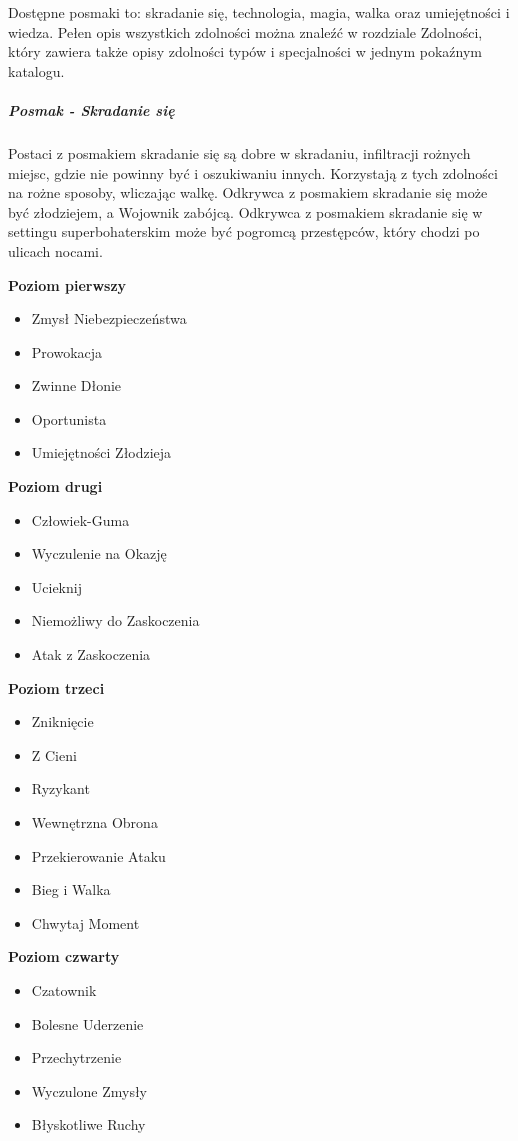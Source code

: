 Dostępne posmaki to: skradanie się, technologia, magia, walka oraz umiejętności i wiedza.
Pełen opis wszystkich zdolności można znaleźć w rozdziale Zdolności, który zawiera także opisy zdolności typów i specjalności w jednym pokaźnym katalogu.

\subparagraph{Posmak - Skradanie się}

Postaci z posmakiem skradanie się są dobre w skradaniu, infiltracji rożnych miejsc, gdzie nie powinny być i oszukiwaniu innych. Korzystają z tych zdolności na rożne sposoby, wliczając walkę. Odkrywca z posmakiem skradanie się może być złodziejem, a Wojownik zabójcą. Odkrywca z posmakiem skradanie się w settingu superbohaterskim może być pogromcą przestępców, który chodzi po ulicach nocami.

\textbf{Poziom pierwszy}

\begin{itemize}
\item Zmysł Niebezpieczeństwa
\item Prowokacja
\item Zwinne Dłonie
\item Oportunista
\item Umiejętności Złodzieja
\end{itemize}

\textbf{Poziom drugi}

\begin{itemize}
\item Człowiek-Guma
\item Wyczulenie na Okazję
\item Ucieknij
\item Niemożliwy do Zaskoczenia
\item Atak z Zaskoczenia
\end{itemize}

\textbf{Poziom trzeci}
\begin{itemize}
\item Zniknięcie
\item Z Cieni
\item Ryzykant
\item Wewnętrzna Obrona
\item Przekierowanie Ataku
\item Bieg i Walka
\item Chwytaj Moment
\end{itemize}

\textbf{Poziom czwarty}
\begin{itemize}
\item Czatownik
\item Bolesne Uderzenie
\item Przechytrzenie
\item Wyczulone Zmysły
\item Błyskotliwe Ruchy
\end{itemize}


